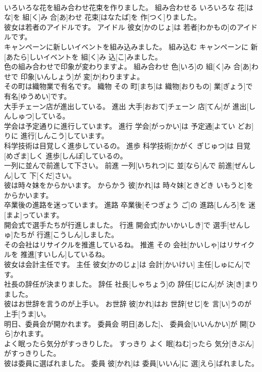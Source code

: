 \documentclass[8pt]{extreport}
\begin{document}
\begin{CJK}{UTF8}{min}
\\	いろいろな花を組み合わせ花束を作りました。	組み合わせる	いろいろな 花[はな]を 組[く]み 合[あ]わせ 花束[はなたば]を 作[つく]りました。	
\\	彼女は若者のアイドルです。	アイドル	彼女[かのじょ]は 若者[わかもの]のアイドルです。	
\\	キャンペーンに新しいイベントを組み込みました。	組み込む	キャンペーンに 新[あたら]しいイベントを 組[く]み 込[こ]みました。	
\\	色の組み合わせで印象が変わりますよ。	組み合わせ	色[いろ]の 組[く]み 合[あ]わせで 印象[いんしょう]が 変[か]わりますよ。	
\\	その町は織物業で有名です。	織物	その 町[まち]は 織物[おりもの] 業[ぎょう]で 有名[ゆうめい]です。	
\\	大手チェーン店が進出している。	進出	大手[おおて]チェーン 店[てん]が 進出[しんしゅつ]している。	
\\	学会は予定通りに進行しています。	進行	学会[がっかい]は 予定通[よてい どお]りに 進行[しんこう]しています。	
\\	科学技術は目覚しく進歩しているの。	進歩	科学技術[かがく ぎじゅつ]は 目覚[めざま]しく 進歩[しんぽ]しているの。	
\\	一列に並んで前進して下さい。	前進	一列[いちれつ]に 並[なら]んで 前進[ぜんしん]して 下[くだ]さい。	
\\	彼は時々妹をからかいます。	からかう	彼[かれ]は 時々妹[ときどき いもうと]をからかいます。	
\\	卒業後の進路を迷っています。	進路	卒業後[そつぎょう ご]の 進路[しんろ]を 迷[まよ]っています。	
\\	開会式で選手たちが行進しました。	行進	開会式[かいかいしき]で 選手[せんしゅ]たちが 行進[こうしん]しました。	
\\	その会社はリサイクルを推進しているね。	推進	その 会社[かいしゃ]はリサイクルを 推進[すいしん]しているね。	
\\	彼女は会計主任です。	主任	彼女[かのじょ]は 会計[かいけい] 主任[しゅにん]です。	
\\	社長の辞任が決まりました。	辞任	社長[しゃちょう]の 辞任[じにん]が 決[き]まりました。	
\\	彼はお世辞を言うのが上手い。	お世辞	彼[かれ]はお 世辞[せじ]を 言[い]うのが 上手[うま]い。	
\\	明日、委員会が開かれます。	委員会	明日[あした]、 委員会[いいんかい]が 開[ひら]かれます。	
\\	よく眠ったら気分がすっきりした。	すっきり	よく 眠[ねむ]ったら 気分[きぶん]がすっきりした。	
\\	彼は委員に選ばれました。	委員	彼[かれ]は 委員[いいん]に 選[えら]ばれました。	

\end{CJK}
\end{document}
